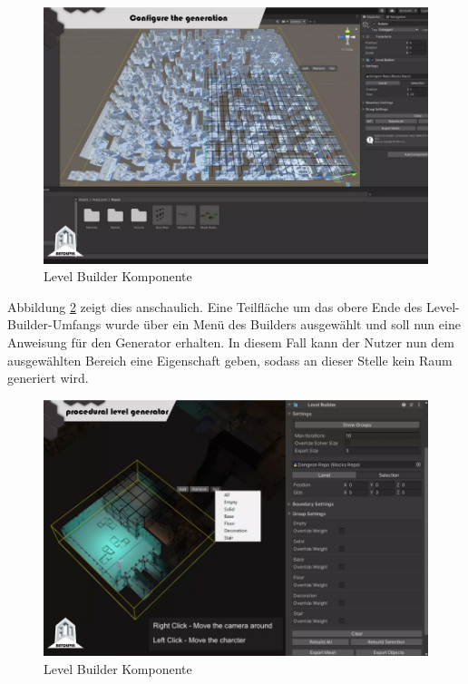 \begin{figure}[ht]
\centering
\includegraphics[width=1\linewidth]{content/pictures/FirstSteps00.png}
\caption{Level Builder Komponente \cite{alasl_autolevel_nodate}}
\label{fig:level_builder}
\end{figure}

Abbildung \ref{fig:level_builder_edit} zeigt dies anschaulich. Eine Teilfläche um das obere Ende des Level-Builder-Umfangs wurde über ein Menü des Builders ausgewählt und soll nun eine Anweisung für den Generator erhalten. In diesem Fall kann der Nutzer nun dem ausgewählten Bereich eine Eigenschaft geben, sodass an dieser Stelle kein Raum generiert wird.

\begin{figure}[ht]
\centering
\includegraphics[width=1\linewidth]{content/pictures/FirstSteps01.png}
\caption{Level Builder Komponente \cite{alasl_autolevel_nodate}}
\label{fig:level_builder_edit}
\end{figure}


